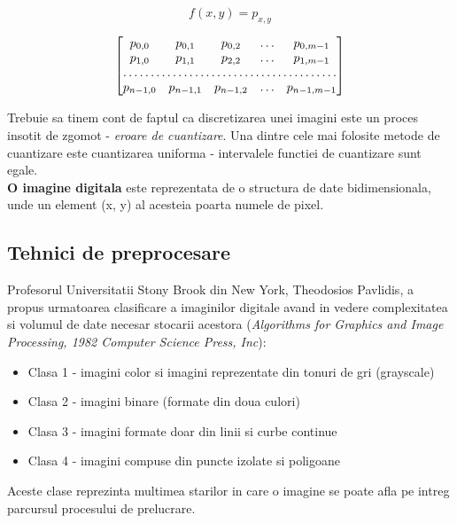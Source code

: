 \documentclass[10pt]{article}
\begin{document}
\begin{equation}\label{eq:3}
	f(x,y) = p_{x,y}
\end{equation}

\[
\begin{bmatrix}
    p_{0,0}       & p_{0,1} & p_{0,2} & \dots & p_{0,m-1} \\
    p_{1,0}       & p_{1,1} & p_{2,2} & \dots & p_{1,m-1} \\
    \hdotsfor{5} \\
    p_{n-1,0}       & p_{n-1,1} & p_{n-1,2} & \dots & p_{n-1,m-1}
\end{bmatrix}
\]

\> Trebuie sa tinem cont de faptul ca discretizarea unei imagini este un proces insotit de zgomot - {\it eroare de cuantizare}.
Una dintre cele mai folosite metode de cuantizare este cuantizarea uniforma - intervalele
functiei de cuantizare sunt egale. \\

\> {\bf O imagine digitala} este reprezentata de o structura de date bidimensionala, unde un
element (x, y) al acesteia poarta numele de pixel.

\newpage

\subsection{Tehnici de preprocesare}

\> Profesorul Universitatii Stony Brook din New York, Theodosios Pavlidis, 
a propus urmatoarea clasificare a imaginilor digitale avand in vedere complexitatea
si volumul de date necesar stocarii acestora ({\it Algorithms for Graphics and Image Processing, 1982 Computer Science Press, Inc}):

\begin{itemize}

	\item Clasa 1 - imagini color si imagini reprezentate din tonuri de gri (grayscale)
	\item Clasa 2 - imagini binare (formate din doua culori)
	\item Clasa 3 - imagini formate doar din linii si curbe continue
	\item Clasa 4 - imagini compuse din puncte izolate si poligoane  

\end{itemize}

\> Aceste clase reprezinta multimea starilor in care o imagine se poate afla pe intreg parcursul procesului de prelucrare.
\end{document}
